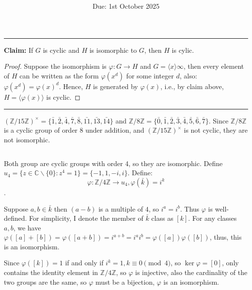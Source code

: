 \documentclass[12pt]{article}
\title{\textbf{\mytitle}}
\author{\textbf{\myauthor}}
\date{Due: 1st October 2025}
\begin{document}
\onehalfspacing
\maketitle

\section{} %
\subsection{} %
\noindent\rule{\textwidth}{1pt}

\textbf{Claim: }If $G$ is cyclic and $H$ is isomorphic to $G$, then $H$ is cylic.
\begin{proof}
Suppose the isomorphism is $\varphi: G\rightarrow H$ and $G=\langle x\rangle\infty$, then every element of $H$ can be written as the form $\varphi(x^d)$ for some integer $d$, also: $\varphi(x^d)=\varphi(x)^d$. Hence, $H$ is generated by $\varphi(x)$, i.e., by claim above, $H=\langle \varphi(x)\rangle$ is cyclic.
\end{proof}

\noindent\rule{\textwidth}{1pt}


$(\mathbb{Z}/15\mathbb{Z})^{\times}=\{\bar{1},\bar{2},\bar{4},\bar{7},\bar{8},\bar{11},\bar{13},\bar{14}\}$ and $\mathbb{Z}/8\mathbb{Z}=\{\bar{0},\bar{1},\bar{2},\bar{3},\bar{4},\bar{5},\bar{6},\bar{7}\}$. Since $\mathbb{Z}/8\mathbb{Z}$ is a cyclic group of order $8$ under addition, and $(\mathbb{Z}/15\mathbb{Z})^{\times}$ is not cyclic, they are not isomorphic.
\subsection{} %
Both group are cyclic groups with order 4, so they are isomorphic. Define $u_4=\{z\in \mathbb{C}\backslash\{0\}:z^4=1\}=\{-1, 1, -i, i\}$. Define:
$$\varphi:\mathbb{Z}/4\mathbb{Z}\rightarrow u_4,\varphi{(\bar{k})}=i^{k}$$.

Suppose $a,b\in\bar{k}$ then $(a-b)$ is a multiple of $4$, so $i^{a}=i^b$. Thus $\varphi$ is well-defined. For simplicity, I denote the member of $\bar{k}$ class as $[k]$. For any classes $a,b$, we have $\varphi([a]+[b])=\varphi([a+b])=i^{a+b}=i^a i^b=\varphi([a])\varphi([b])$, thus, this is an isomorphism.

Since $\varphi([k])=1$ if and only if $i^k=1, k\equiv0\pmod{4}$, so $\ker\varphi={[0]}$, only contains the identity element in $\mathbb Z/4\mathbb Z$, so $\varphi$ is injective, also the cardinality of the two groups are the same, so $\varphi$ must be a bijection, $\varphi$ is an isomorphism.
\end{document}

